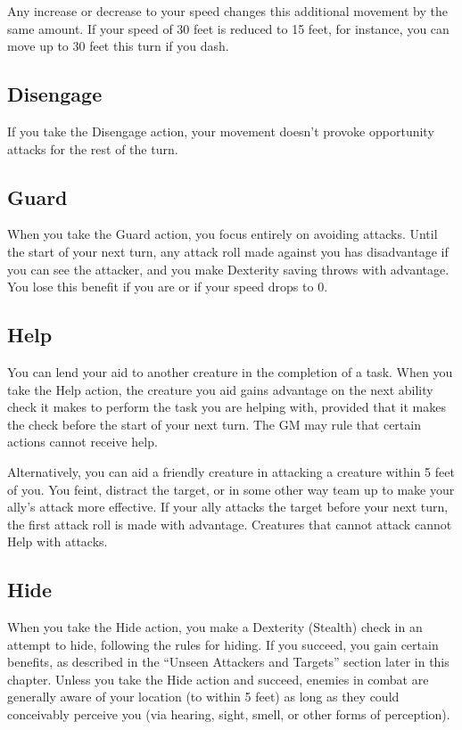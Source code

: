 Any increase or decrease to your speed changes this additional movement by the same amount. If your speed of 30 feet is reduced to 15 feet, for instance, you can move up to 30 feet this turn if you dash.

\subsection{Disengage}

If you take the Disengage action, your movement doesn't provoke opportunity attacks for the rest of the turn.

\subsection{Guard}

When you take the Guard action, you focus entirely on avoiding attacks. Until the start of your next turn, any attack roll made against you has disadvantage if you can see the attacker, and you make Dexterity saving throws with advantage. You lose this benefit if you are  or if your speed drops to 0.

\subsection{Help}

You can lend your aid to another creature in the completion of a task. When you take the Help action, the creature you aid gains advantage on the next ability check it makes to perform the task you are helping with, provided that it makes the check before the start of your next turn. The GM may rule that certain actions cannot receive help.

Alternatively, you can aid a friendly creature in attacking a creature within 5 feet of you. You feint, distract the target, or in some other way team up to make your ally's attack more effective. If your ally attacks the target before your next turn, the first attack roll is made with advantage. Creatures that cannot attack cannot Help with attacks.

\subsection{Hide}

When you take the Hide action, you make a Dexterity (Stealth) check in an attempt to hide, following the rules for hiding. If you succeed, you gain certain benefits, as described in the “Unseen Attackers and Targets” section later in this chapter. Unless you take the Hide action and succeed, enemies in combat are generally aware of your location (to within 5 feet) as long as they could conceivably perceive you (via hearing, sight, smell, or other forms of perception).

